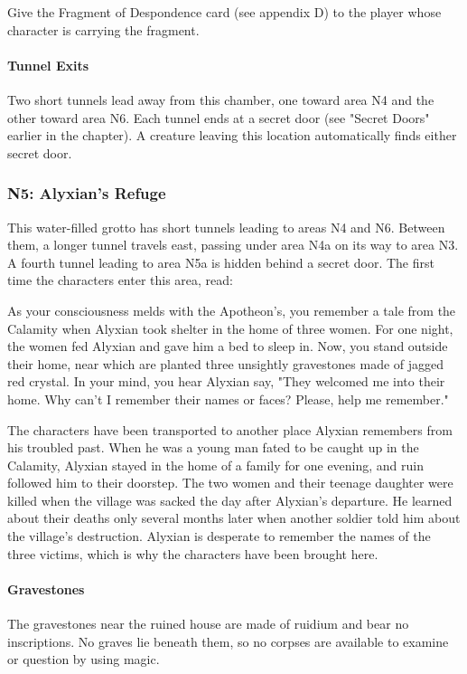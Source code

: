 \documentclass[10pt,a4,twoside,twocolumn,openany,nodeprecatedcode]{dndbook}
\begin{document}
Give the Fragment of Despondence card (see appendix D) to the player whose character is carrying the fragment.
\paragraph{Tunnel Exits}
Two short tunnels lead away from this chamber, one toward area N4 and the other toward area N6. Each tunnel ends at a secret door (see "Secret Doors" earlier in the chapter). A creature leaving this location automatically finds either secret door.
\subsubsection{N5: Alyxian's Refuge}
This water-filled grotto has short tunnels leading to areas N4 and N6. Between them, a longer tunnel travels east, passing under area N4a on its way to area N3. A fourth tunnel leading to area N5a is hidden behind a secret door.
The first time the characters enter this area, read:
\begin{DndReadAloud}{}
As your consciousness melds with the Apotheon's, you remember a tale from the Calamity when Alyxian took shelter in the home of three women. For one night, the women fed Alyxian and gave him a bed to sleep in. Now, you stand outside their home, near which are planted three unsightly gravestones made of jagged red crystal.
In your mind, you hear Alyxian say, "They welcomed me into their home. Why can't I remember their names or faces? Please, help me remember."
\end{DndReadAloud}

The characters have been transported to another place Alyxian remembers from his troubled past. When he was a young man fated to be caught up in the Calamity, Alyxian stayed in the home of a family for one evening, and ruin followed him to their doorstep. The two women and their teenage daughter were killed when the village was sacked the day after Alyxian's departure. He learned about their deaths only several months later when another soldier told him about the village's destruction. Alyxian is desperate to remember the names of the three victims, which is why the characters have been brought here.
\paragraph{Gravestones}
The gravestones near the ruined house are made of ruidium and bear no inscriptions. No graves lie beneath them, so no corpses are available to examine or question by using magic.
\end{document}
